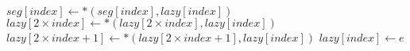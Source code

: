 \begin{algorithm}
\begin{algorithmic}[1]
            \State $seg[index] \gets \ast(seg[index], lazy[index])$
                \State $lazy[2 \times index] \gets \ast(lazy[2 \times index], lazy[index])$
                \State $lazy[2 \times index + 1] \gets \ast(lazy[2 \times index + 1], lazy[index])$
            \EndIf
            \State $lazy[index] \gets e$ 
        \EndIf
    \EndProcedure
    \end{algorithmic}
\end{algorithm}
